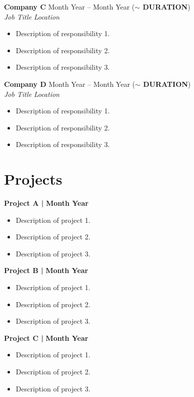\documentclass[a4paper,10pt]{article}
\newcommand{\entry}[4]{
  \noindent\textbf{#1} \hfill #2 \\
  \noindent\textit{#3} \hfill \textit{#4} \\
  \vspace{2pt}
}
\newcommand{\project}[2]{
  \noindent\textbf{#1} \hfill #2 \\
  \vspace{2pt}
}
\begin{document}
\entry{Company C}{\faCalendar \space Month Year -- Month Year (\textbf{$\sim$ DURATION})}{Job Title}{\faMapMarker \space Location}
\vspace{-1.6em}
\begin{itemize}
\setlength\itemsep{-0.3em}
\item Description of responsibility 1.
\item Description of responsibility 2.
\item Description of responsibility 3.
\end{itemize}

\entry{Company D}{\faCalendar \space Month Year -- Month Year (\textbf{$\sim$ DURATION})}{Job Title}{\faMapMarker \space Location}
\vspace{-1.6em}
\begin{itemize}
\setlength\itemsep{-0.3em}
\item Description of responsibility 1.
\item Description of responsibility 2.
\item Description of responsibility 3.
\end{itemize}

\section*{Projects}
\vspace{0.6em}
\project{Project A | }{\textbf{Month Year}}
\vspace{-1.6em}
\begin{itemize}
\setlength\itemsep{-0.3em}
\item Description of project 1.
\item Description of project 2.
\item Description of project 3.
\end{itemize}

\project{Project B | }{\textbf{Month Year}}
\vspace{-1.6em}
\begin{itemize}
\setlength\itemsep{-0.3em}
\item Description of project 1.
\item Description of project 2.
\item Description of project 3.
\end{itemize}

\project{Project C | }{\textbf{Month Year}}
\vspace{-1.6em}
\begin{itemize}
\setlength\itemsep{-0.3em}
\item Description of project 1.
\item Description of project 2.
\item Description of project 3.
\end{itemize}
\end{document}
